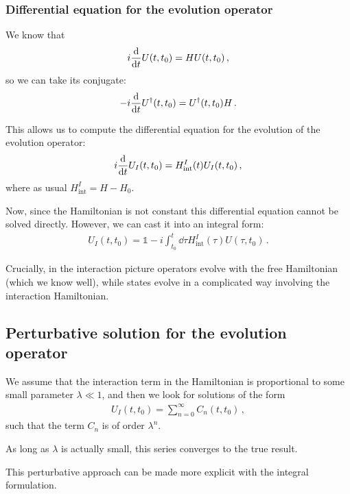 \documentclass[main.tex]{subfiles}
\begin{document}
\subsubsection{Differential equation for the evolution operator}

We know that 
%
\begin{align}
i \dv{}{t} U (t, t_0 ) = H U (t, t_0 )
\,,
\end{align}
%
so we can take its conjugate: 
%
\begin{align}
- i \dv{}{t} U ^\dag (t, t_0 ) = U ^\dag (t, t_0 ) H 
\,.
\end{align}

This allows us to compute the differential equation for the evolution of the evolution operator: 
%
\begin{align}
i \dv{}{t} U_I (t, t_0 ) 
= H _{\text{int}}^{I} (t) U_I (t, t_0 )
\,,
\end{align}
%
where as usual \(H_{\text{int}}^{I} = H - H_0 \). 

Now, since the Hamiltonian is not constant this differential equation cannot be solved directly. However, we can cast it into an integral form: 
%
\begin{align}
U_I (t, t_0 ) = \mathbb{1} - i \int_{t_0 }^{t} \dd{\tau }
H _{\text{int}}^{I} (\tau ) U(\tau , t_0 )
\,.
\end{align}

Crucially, in the interaction picture operators evolve with the free Hamiltonian (which we know well), while states evolve in a complicated way involving the interaction Hamiltonian. 

\subsection{Perturbative solution for the evolution operator}

We assume that the interaction term in the Hamiltonian is proportional to some small parameter \(\lambda \ll 1 \), and then we look for solutions of the form 
%
\begin{align}
U_I (t, t_0 ) = \sum _{n=0}^{\infty } C_n (t, t_0 )
\,,
\end{align}
%
such that the term \(C_n\) is of order \(\lambda^{n }\).

As long as \(\lambda \) is actually small, this series converges to the true result.

This perturbative approach can be made more explicit with the integral formulation.
\end{document}
